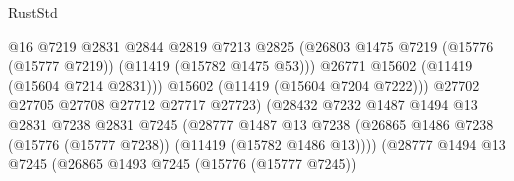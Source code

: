 \begin{lexlean}{RustStd}
\begin{coremodule}
                                              @16
                                              @7219
                                              @2831
                                              @2844
                                              @2819
                                              @7213
                                              @2825
                                              (@26803
                                                @1475
                                                @7219
                                                (@15776 (@15777 @7219))
                                                (@11419 (@15782 @1475 @53)))
                                              @26771
                                              @15602
                                              (@11419 (@15604 @7214 @2831)))
                                            @15602
                                            (@11419 (@15604 @7204 @7222)))
                                          @27702
                                          @27705
                                          @27708
                                          @27712
                                          @27717
                                          @27723)
                                        (@28432
                                          @7232
                                          @1487
                                          @1494
                                          @13
                                          @2831
                                          @7238
                                          @2831
                                          @7245
                                          (@28777
                                            @1487
                                            @13
                                            @7238
                                            (@26865
                                              @1486
                                              @7238
                                              (@15776 (@15777 @7238))
                                              (@11419 (@15782 @1486 @13))))
                                          (@28777
                                            @1494
                                            @13
                                            @7245
                                            (@26865
                                              @1493
                                              @7245
                                              (@15776 (@15777 @7245))

\end{coremodule}
\end{lexlean}
